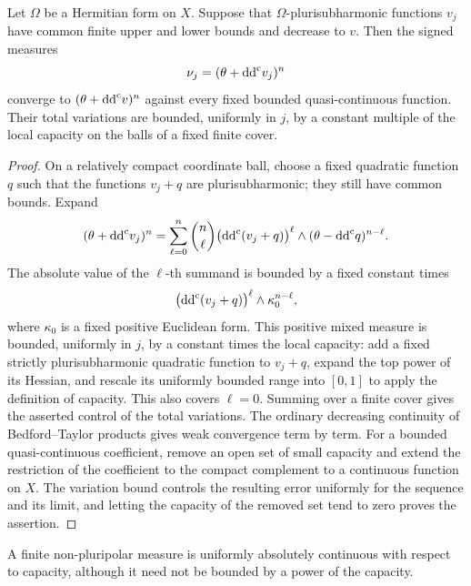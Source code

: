 \begin{lemma}\label{lem:signed-truncation-quasicont}
Let $\Omega$ be a Hermitian form on $X$. Suppose that $\Omega$-plurisubharmonic functions $v_j$ have common finite upper and lower bounds and decrease to $v$. Then the signed measures
\[
 \nu_j=(\theta+\mathrm{dd}^{\mathrm{c}} v_j)^n
\]
converge to $(\theta+\mathrm{dd}^{\mathrm{c}} v)^n$ against every fixed bounded quasi-continuous function. Their total variations are bounded, uniformly in $j$, by a constant multiple of the local capacity on the balls of a fixed finite cover.
\end{lemma}
\begin{proof}
On a relatively compact coordinate ball, choose a fixed quadratic function $q$ such that the functions $v_j+q$ are plurisubharmonic; they still have common bounds. Expand
\[
 (\theta+\mathrm{dd}^{\mathrm{c}} v_j)^n
 =\sum_{\ell=0}^n\binom n\ell
   \bigl(\mathrm{dd}^{\mathrm{c}}(v_j+q)\bigr)^\ell
       \wedge(\theta-\mathrm{dd}^{\mathrm{c}} q)^{n-\ell}.
\]
The absolute value of the $\ell$-th summand is bounded by a fixed constant times
\[
 \bigl(\mathrm{dd}^{\mathrm{c}}(v_j+q)\bigr)^\ell\wedge\kappa_0^{n-\ell},
\]
where $\kappa_0$ is a fixed positive Euclidean form. This positive mixed measure is bounded, uniformly in $j$, by a constant times the local capacity: add a fixed strictly plurisubharmonic quadratic function to $v_j+q$, expand the top power of its Hessian, and rescale its uniformly bounded range into $[0,1]$ to apply the definition of capacity. This also covers $\ell=0$. Summing over a finite cover gives the asserted control of the total variations. The ordinary decreasing continuity of Bedford--Taylor products gives weak convergence term by term. For a bounded quasi-continuous coefficient, remove an open set of small capacity and extend the restriction of the coefficient to the compact complement to a continuous function on $X$. The variation bound controls the resulting error uniformly for the sequence and its limit, and letting the capacity of the removed set tend to zero proves the assertion.
\end{proof}

A finite non-pluripolar measure is uniformly absolutely continuous with respect to capacity, although it need not be bounded by a power of the capacity.

